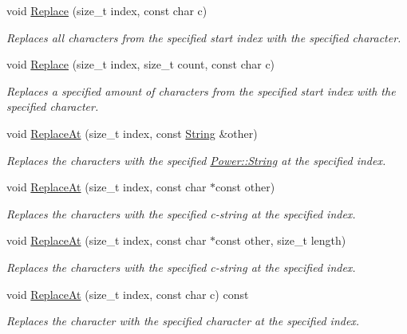 \begin{DoxyCompactItemize}
void \hyperlink{class_power_1_1_string_aaa587a207643c7dbb401574651b42ff2}{Replace} (size\+\_\+t index, const char c)
\begin{DoxyCompactList}\small\item\em Replaces all characters from the specified start index with the specified character. \end{DoxyCompactList}\item 
void \hyperlink{class_power_1_1_string_ac577d7badcecee8bf6f55bd7150bbb4b}{Replace} (size\+\_\+t index, size\+\_\+t count, const char c)
\begin{DoxyCompactList}\small\item\em Replaces a specified amount of characters from the specified start index with the specified character. \end{DoxyCompactList}\item 
void \hyperlink{class_power_1_1_string_ac6ffc1ce89a2caff3d96cbb738f3f081}{Replace\+At} (size\+\_\+t index, const \hyperlink{class_power_1_1_string}{String} \&other)
\begin{DoxyCompactList}\small\item\em Replaces the characters with the specified \hyperlink{class_power_1_1_string}{Power\+::\+String} at the specified index. \end{DoxyCompactList}\item 
void \hyperlink{class_power_1_1_string_a5e666114028b7a41dc402eae7dd9ab37}{Replace\+At} (size\+\_\+t index, const char $\ast$const other)
\begin{DoxyCompactList}\small\item\em Replaces the characters with the specified c-\/string at the specified index. \end{DoxyCompactList}\item 
void \hyperlink{class_power_1_1_string_af5aa96c8291a9aceb80aa7172a7a2790}{Replace\+At} (size\+\_\+t index, const char $\ast$const other, size\+\_\+t length)
\begin{DoxyCompactList}\small\item\em Replaces the characters with the specified c-\/string at the specified index. \end{DoxyCompactList}\item 
void \hyperlink{class_power_1_1_string_af0a58ed0c1b62fc36e60f5948d3e8052}{Replace\+At} (size\+\_\+t index, const char c) const
\begin{DoxyCompactList}\small\item\em Replaces the character with the specified character at the specified index. \end{DoxyCompactList}\item 

\end{DoxyCompactItemize}
